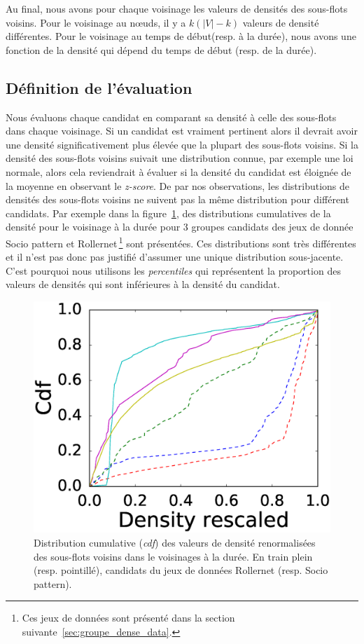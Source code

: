 Au final, nous avons pour chaque voisinage les valeurs de densités des sous-flots voisins.
Pour le voisinage au n\oe uds, il y a $k(|V|-k)$ valeurs de densité différentes.
Pour le voisinage au temps de début(resp. à la durée), nous avons une fonction de la densité qui dépend du temps de début (resp. de la durée).


\subsection{Définition de l'évaluation}
Nous évaluons chaque candidat en comparant sa densité à celle des sous-flots dans chaque voisinage.
Si un candidat est vraiment pertinent alors il devrait avoir une densité significativement plus élevée que la plupart des sous-flots voisins.
Si la densité des sous-flots voisins suivait une distribution connue, par exemple une loi normale, alors cela reviendrait à évaluer si la densité du candidat est éloignée de la moyenne en observant le \emph{z-score}.
De par nos observations, les distributions de densités des sous-flots voisins ne suivent pas la même distribution pour différent candidats.
Par exemple dans la figure~\ref{fig:distrib_dens}, des distributions cumulatives de la densité pour le voisinage à la durée pour 3 groupes candidats des jeux de donnée Socio pattern et Rollernet\,\footnote{Ces jeux de données sont présenté dans la section suivante~\ref{sec:groupe_dense_data}.} sont présentées.
Ces distributions sont très différentes et il n'est pas donc pas justifié d'assumer une unique distribution sous-jacente.
C'est pourquoi nous utilisons les \emph{percentiles} qui représentent la proportion des valeurs de densités qui sont inférieures à la densité du candidat.


\begin{figure}
\centering
\includegraphics[width=0.3\linewidth]{img/GroupeDense/cdf_density_duration.eps}
\caption{Distribution cumulative (\emph{cdf}) des valeurs de densité renormalisées  des sous-flots voisins dans le voisinages à la durée.
En train plein (resp. pointillé), candidats du jeux de données Rollernet (resp. Socio pattern).}
\label{fig:distrib_dens}
\end{figure}

